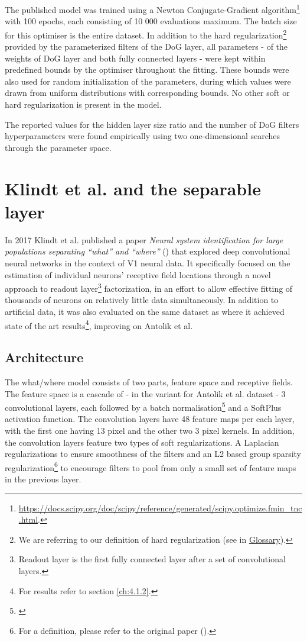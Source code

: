 The published model was trained using a Newton Conjugate-Gradient algorithm\footnote{\href{https://docs.scipy.org/doc/scipy/reference/generated/scipy.optimize.fmin_tnc.html}{https://docs.scipy.org/doc/scipy/reference/generated/scipy.optimize.fmin\_tnc.html}.} with 100 epochs, each consisting of 10 000 evaluations maximum. The batch size for this optimiser is the entire dataset. In addition to the hard regularization\footnote{We are referring to our definition of hard regularization (see in \hyperref[glos:hard-reg]{Glossary}).} provided by the parameterized filters of the DoG layer, all parameters - of the weights of DoG layer and both fully connected layers - were kept within predefined bounds by the optimiser throughout the fitting. These bounds were also used for random initialization of the parameters, during which values were drawn from uniform distributions with corresponding bounds. No other soft or hard regularization is present in the model. 

The reported values for the hidden layer size ratio and the number of DoG filters hyperparameters were found empirically using two one-dimensional searches through the parameter space.

\section{Klindt et al. and the separable layer}\label{ch:2.2}

In 2017 Klindt et al. published a paper \textit{Neural system identification for large populations separating “what” and “where”} (\cite{klindt}) that explored deep convolutional neural networks in the context of V1 neural data. It specifically focused on the estimation of individual neurons’ receptive field locations through a novel approach to readout layer\footnote{Readout layer is the first fully connected layer after a set of convolutional layers.} factorization, in an effort to allow effective fitting of thousands of neurons on relatively little data simultaneously. In addition to artificial data, it was also evaluated on the same dataset as \cite{antolik} where it achieved state of the art results\footnote{For results refer to section \ref{ch:4.1.2}.}, improving on Antolik et al.

\subsection{Architecture}

The what/where model consists of two parts, feature space and receptive fields. The feature space is a cascade of - in the variant for Antolik et al. dataset - 3 convolutional layers, each followed by a batch normalisation\footnote{\cite{2015arXiv150203167I}} and a SoftPlus activation function. The convolution layers have 48 feature maps per each layer, with the first one having 13 pixel and the other two 3 pixel kernels. In addition, the convolution layers feature two types of soft regularizations. A Laplacian regularizations to ensure smoothness of the filters and an L2 based group sparsity regularization\footnote{For a definition, please refer to the original paper (\cite{klindt}).} to encourage filters to pool from only a small set of feature maps in the previous layer.

